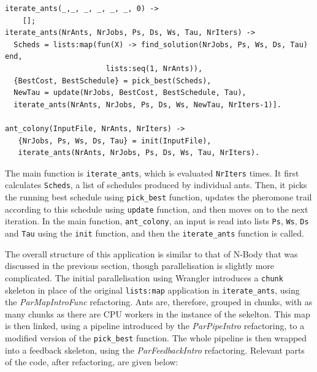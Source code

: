 \documentclass[final]{jfp1}
\begin{document}
\begin{lstlisting}
iterate_ants(_,_, _, _, _, _, 0) ->
    [];
iterate_ants(NrAnts, NrJobs, Ps, Ds, Ws, Tau, NrIters) ->
  Scheds = lists:map(fun(X) -> find_solution(NrJobs, Ps, Ws, Ds, Tau) end,
                       lists:seq(1, NrAnts)),
  {BestCost, BestSchedule} = pick_best(Scheds),
  NewTau = update(NrJobs, BestCost, BestSchedule, Tau),
  iterate_ants(NrAnts, NrJobs, Ps, Ds, Ws, NewTau, NrIters-1)].

ant_colony(InputFile, NrAnts, NrIters) ->
   {NrJobs, Ps, Ws, Ds, Tau} = init(InputFile),
   iterate_ants(NrAnts, NrJobs, Ps, Ds, Ws, Tau, NrIters).
\end{lstlisting}

\noindent
The main function is \lstinline{iterate_ants}, which is evaluated
\lstinline{NrIters} times. It first calculates \lstinline{Scheds},
a list of schedules produced by individual ants. Then, it picks the
running best schedule using \lstinline{pick_best} function, updates the
pheromone trail according to this schedule using \lstinline{update}
function, and then moves on to the next iteration. In the main
function, \lstinline{ant_colony}, an input is read into lists
\lstinline{Ps}, \lstinline{Ws}, \lstinline{Ds} and \lstinline{Tau}
using the \lstinline{init} function, and then the \lstinline{iterate_ants}
function is called. 

The overall structure of this application is similar to that of N-Body 
that was discussed in the previous section, though parallelisation
is slightly more complicated. 
The initial parallelisation using Wrangler
introduces a \lstinline{chunk} skeleton in place of the original
\lstinline{lists:map} application in \lstinline{iterate_ants}, using
the \emph{ParMapIntroFunc} refactoring. Ants are, therefore, grouped
in chunks, with as many chunks as there are CPU workers in the
instance of the sekelton. This map is then linked, using a pipeline
introduced by the \emph{ParPipeIntro} refactoring,
to a modified version of the \lstinline{pick_best} function.
The whole pipeline is then wrapped into
a feedback skeleton, using the \emph{ParFeedbackIntro} refactoring.
Relevant parts of the code, after refactoring, 
are given below:
\end{document}
